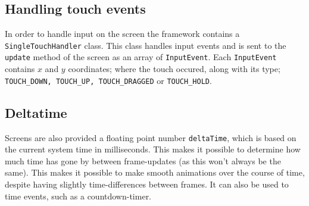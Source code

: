 \subsection{Handling touch events}\label{framework:touchevents}
In order to handle input on the screen the framework contains a \lstinline|SingleTouchHandler| class.
This class handles input events and is sent to the \lstinline|update| method of the screen as an array of \lstinline|InputEvent|.
Each \lstinline|InputEvent| contains $x$ and $y$ coordinates; where the touch occured, along with its type; \lstinline|TOUCH_DOWN, TOUCH_UP, TOUCH_DRAGGED| or \lstinline|TOUCH_HOLD|.

\subsection{Deltatime}\label{framework:deltatime}
Screens are also provided a floating point number \lstinline|deltaTime|, which is based on the current system time in milliseconds.
This makes it possible to determine how much time has gone by between frame-updates (as this won't always be the same).
This makes it possible to make smooth animations over the course of time, despite having slightly time-differences between frames.
It can also be used to time events, such as a countdown-timer.